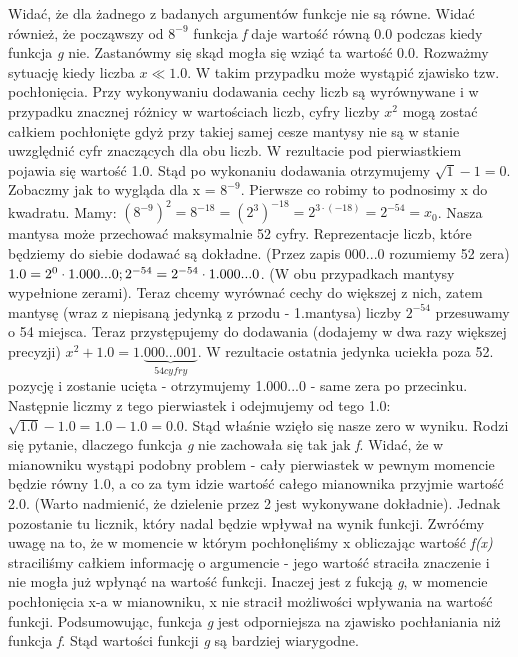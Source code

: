 \documentclass[]{article}
\begin{document}
	\clearpage
	Widać, że dla żadnego z badanych argumentów funkcje nie są równe. Widać również, że począwszy od \(8^{-9}\) funkcja \textit{f} daje wartość równą 0.0 podczas kiedy funkcja \textit{g} nie. Zastanówmy się skąd mogła się wziąć ta wartość 0.0. Rozważmy sytuację kiedy liczba $x \ll 1.0$. W takim przypadku może wystąpić zjawisko tzw. pochłonięcia. Przy wykonywaniu dodawania cechy liczb są wyrównywane i w przypadku znacznej różnicy w wartościach liczb, cyfry liczby $x^2$ mogą zostać całkiem pochłonięte gdyż przy takiej samej cesze mantysy nie są w stanie uwzględnić cyfr znaczących dla obu liczb. W rezultacie pod pierwiastkiem pojawia się wartość 1.0. Stąd po wykonaniu dodawania otrzymujemy \(\sqrt{1} - 1 = 0\).\newline
	Zobaczmy jak to wygląda dla x = \(8^{-9}\). Pierwsze co robimy to podnosimy x do kwadratu. Mamy:
	 \(({8^{-9}})^2 = 8^{-18} = ({2^3})^{-18} = 2^{3 \cdot (-18)} = 2^{-54} = x_0\). Nasza mantysa może przechować maksymalnie 52 cyfry. Reprezentacje liczb, które będziemy do siebie dodawać są dokładne. (Przez zapis 000...0 rozumiemy 52 zera)
	 \(1.0 = 2^0 \cdot 1.000...0;\space\space2^{-54} = 2^{-54} \cdot 1.000...0\). (W obu przypadkach mantysy wypełnione zerami). Teraz chcemy wyrównać cechy do większej z nich, zatem mantysę (wraz z niepisaną jedynką z przodu - 1.mantysa) liczby $2^{-54}$ przesuwamy o 54 miejsca. Teraz przystępujemy do dodawania (dodajemy w dwa razy większej precyzji) $x^2 + 1.0 = 1.\underbrace{000...001}_{54 cyfry}$.
	 W rezultacie ostatnia jedynka uciekła poza 52. pozycję i zostanie ucięta - otrzymujemy 1.000...0 - same zera po przecinku. Następnie liczmy z tego pierwiastek i odejmujemy od tego 1.0: \(\sqrt{1.0} - 1.0 = 1.0 - 1.0 = 0.0\). Stąd właśnie wzięło się nasze zero w wyniku.\newline
	 Rodzi się pytanie, dlaczego funkcja \textit{g} nie zachowała się tak jak \textit{f}. Widać, że w mianowniku wystąpi podobny problem - cały pierwiastek w pewnym momencie będzie równy 1.0, a co za tym idzie wartość całego mianownika przyjmie wartość 2.0. (Warto nadmienić, że dzielenie przez 2 jest wykonywane dokładnie). Jednak pozostanie tu licznik, który nadal będzie wpływał na wynik funkcji. Zwróćmy uwagę na to, że w momencie w którym pochłonęliśmy x obliczając wartość \textit{f(x)} straciliśmy całkiem informację o argumencie - jego wartość straciła znaczenie i nie mogła już wpłynąć na wartość funkcji. Inaczej jest z fukcją \textit{g}, w momencie pochłonięcia x-a w mianowniku, x nie stracił możliwości wpływania na wartość funkcji. Podsumowując, funkcja \textit{g} jest odporniejsza na zjawisko pochłaniania niż funkcja \textit{f}. Stąd wartości funkcji \textit{g} są bardziej wiarygodne.
	\clearpage
\end{document}
